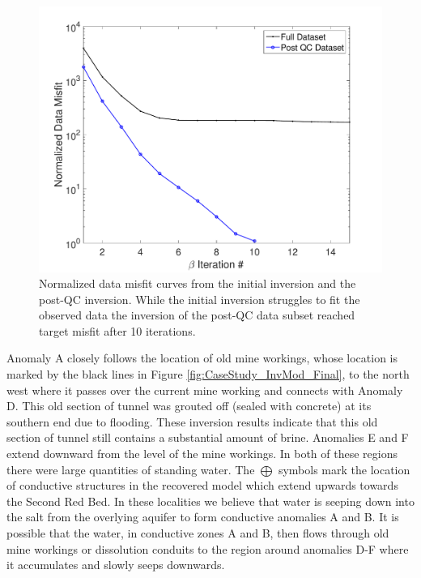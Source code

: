 \documentclass[final,authoryear,5p,times,twocolumn]{elsarticle}
\begin{document}
\begin{figure} [!ht]
\label{fig:CaseStudy_InvMod}
\end{figure}

\begin{figure} [!ht]
	\begin{center}
	\includegraphics[trim=1.3cm 0.2cm 2.6cm 1.2cm, clip=true,width=0.75\linewidth]{./Figures/Fig18.pdf}
	\end{center}
\caption{Normalized data misfit curves from the initial inversion and the post-QC inversion. While the initial inversion struggles to fit the observed data the inversion of the post-QC data subset reached target misfit after 10 iterations.}
\label{fig:CaseStudy_Inv_MisfitPlots}
\end{figure}

Anomaly A closely follows the location of old mine workings, whose location is marked by the black lines in Figure \ref{fig:CaseStudy_InvMod_Final}, to the north west where it passes over the current mine working and connects with Anomaly D. This old section of tunnel was grouted off (sealed with concrete) at its southern end due to flooding. These inversion results indicate that this old section of tunnel still contains a substantial amount of brine. Anomalies E and F extend downward from the level of the mine workings. In both of these regions there were large quantities of standing water. The $\bigoplus$ symbols mark the location of conductive structures in the recovered model which extend upwards towards the Second Red Bed. In these localities we believe that water is seeping down into the salt from the overlying aquifer to form conductive anomalies A and B. It is possible that the water, in conductive zones A and B, then flows through old mine workings or dissolution conduits to the region around anomalies D-F where it accumulates and slowly seeps downwards.  
\end{document}
